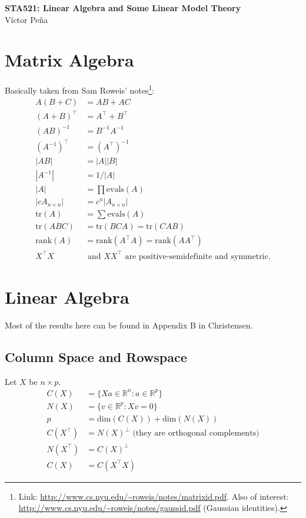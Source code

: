 \documentclass[letterpaper,11pt]{article}
\renewcommand{\t}{^\intercal} %
\newcommand{\1}{\mathbf{1}} %
\begin{document}


\begin{center}
\Large \textbf{STA521: Linear Algebra and Some Linear Model Theory} \\
\vspace{.5pc}
\large Víctor Peña \\
\end{center}
\tableofcontents

\newpage

\section{Matrix Algebra}
Basically taken from Sam Roweis' notes\footnote{Link:
  \url{http://www.cs.nyu.edu/~roweis/notes/matrixid.pdf}. Also of
  interest: \url{http://www.cs.nyu.edu/~roweis/notes/gaussid.pdf} (Gaussian identities).}:
\begin{align*}
A(B+C) &= AB + AC \\
(A+B)\t &= A\t + B\t \\ 
(AB)^{-1} &= B^{-1} A^{-1} \\
(A^{-1}) \t &= (A \t)^{-1} \\
|AB| &= |A| |B| \\
|A^{-1}| &= 1/|A| \\
|A| &= \prod \mathrm{evals}(A) \\
|c A_{n \times n}| &= c^n |A_{n \times n}| \\  
\mathrm{tr}(A) &= \sum \mathrm{evals}(A) \\
\mathrm{tr}(ABC) &= \mathrm{tr}(BCA) = \mathrm{tr}(CAB) \\
\mathrm{rank}(A) &= \mathrm{rank}(A \t A) = \mathrm{rank}(A A \t) \\
X \t X &\text{ and } X X \t \text{ are positive-semidefinite and symmetric}.  
\end{align*}
\section{Linear Algebra}
Most of the results here can be found in Appendix B in Christensen.
\subsection{Column Space and Rowspace}
Let $X$ be $n \times p$.
\begin{align*}
C(X) &= \{X a \in \mathbb{R}^n : a \in \mathbb{R}^p\} \\
N(X) &= \{v \in \mathbb{R}^p : X v = 0\} \\
p & = \mathrm{dim}(C(X)) + \mathrm{dim}(N(X)) \\
C(X \t) &= N(X)^\perp \text{ (they are orthogonal complements)}\\
N(X \t) &= C(X)^\perp \\
C(X) &= C(X \t X) 
\end{align*}
\end{document}
